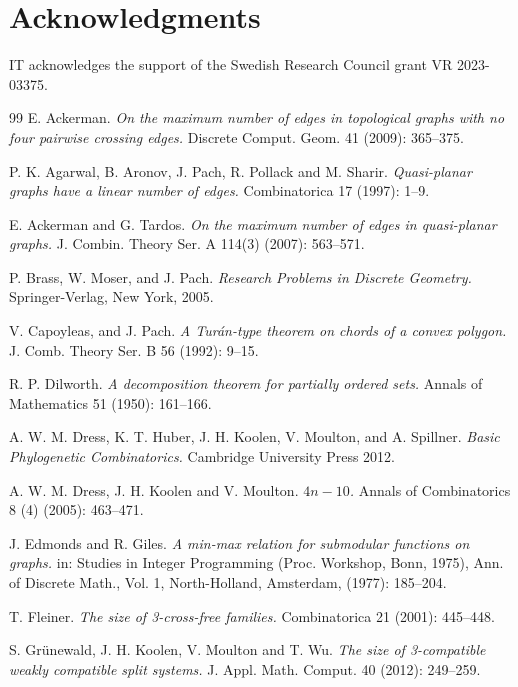 \documentclass[11pt]{article}
\theoremstyle{definition}
\begin{document}
\section*{Acknowledgments}

IT acknowledges the support of the Swedish Research Council grant VR 2023-03375.

\begin{thebibliography}{99}
\setlength{\itemsep}{0pt}  %
\setlength{\parsep}{0pt}
E. Ackerman.
\emph{On the maximum number of edges in topological graphs with no four
pairwise crossing edges.}
Discrete Comput. Geom. 41 (2009): 365--375.

P. K. Agarwal, B. Aronov, J. Pach, R. Pollack and M. Sharir.
\emph{Quasi-planar graphs have a linear number of edges.}
Combinatorica 17 (1997): 1--9.

E. Ackerman and G. Tardos.
\emph{On the maximum number of edges in quasi-planar graphs.}
J. Combin. Theory Ser. A 114(3) (2007): 563--571.

P. Brass, W. Moser, and J. Pach.
\emph{Research Problems in Discrete Geometry.}
Springer-Verlag, New York, 2005.

 V. Capoyleas, and J. Pach.
 \emph{A Tur\'an-type theorem on chords of a convex polygon.}
J. Comb. Theory Ser. B 56 (1992): 9--15.

R. P. Dilworth.
\emph{A decomposition theorem for partially ordered sets.}
Annals of Mathematics 51 (1950): 161--166.

A. W. M. Dress, K. T. Huber, J. H. Koolen, V. Moulton, and A. Spillner.
\emph{Basic Phylogenetic Combinatorics.}
Cambridge University Press 2012.

A. W. M. Dress, J. H. Koolen and V. Moulton.
\emph{$4n-10$.}
Annals of Combinatorics 8 (4) (2005): 463--471.

J. Edmonds and R. Giles.
\emph{A min-max relation for submodular functions on graphs.}
in: Studies in Integer Programming (Proc. Workshop, Bonn, 1975), Ann. of Discrete
Math., Vol. 1, North-Holland, Amsterdam, (1977): 185--204.

T. Fleiner.
\emph{The size of 3-cross-free families.}
Combinatorica 21 (2001): 445--448.

S. Gr\"unewald, J. H. Koolen, V. Moulton and T. Wu.
\emph{The size of 3-compatible weakly compatible split systems.}
J. Appl. Math. Comput. 40 (2012): 249--259.


\end{thebibliography}
\end{document}
